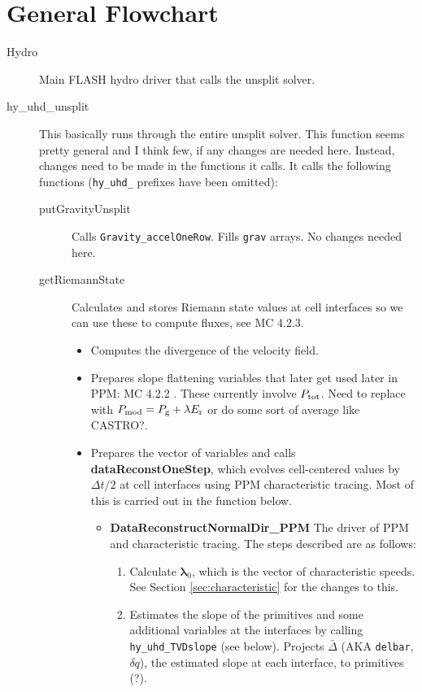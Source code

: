 \documentclass[preprint,11pt]{aastex}
\begin{document}
\section{General Flowchart}
\label{sec:flowchart}
\begin{description}
	\item[Hydro] Main FLASH hydro driver that calls the unsplit solver.
	\item[hy\_uhd\_unsplit] This basically runs through the entire unsplit solver.  {\color{blue}This function seems pretty general and I think few, if any changes are needed here.  Instead, changes need to be made in the functions it calls.}  It calls the following functions (\verb!hy_uhd_! prefixes have been omitted):
	\begin{description}
		\item[putGravityUnsplit] Calls \verb!Gravity_accelOneRow!.  Fills \verb!grav! arrays.  {\color{blue}No changes needed here}.
		\item[getRiemannState]  Calculates and stores Riemann state values at cell interfaces so we can use these to compute fluxes, see MC 4.2.3.
		\begin{itemize}
			\item Computes the divergence of the velocity field.
			\item Prepares slope flattening variables that later get used later in PPM: MC 4.2.2 . {\color{red} These currently involve $P_{\rm tot}$.} {\color{blue} Need to replace with $P_{\rm mod} = P_{\rm g} + \lambda E_{\rm r}$ or do some sort of average like CASTRO?}.
			\item Prepares the vector of variables and calls \textbf{dataReconstOneStep}, which evolves cell-centered values by $\Delta t / 2$ at cell interfaces using PPM characteristic tracing.  Most of this is carried out in the function below.
			\begin{itemize}
				\item \textbf{DataReconstructNormalDir\_PPM} The driver of PPM and characteristic tracing.  The steps described are as follows:
				\begin{enumerate}
					\item Calculate $\boldsymbol{\lambda}_0$, which is the vector of characteristic speeds. {\color{red} See Section \ref{sec:characteristic} for the changes to this.}
					\item Estimates the slope of the primitives and some additional variables at the interfaces by calling \verb!hy_uhd_TVDslope! (see below).  Projects $\bar{\Delta}$ (AKA \verb!delbar!, $\delta q$), the estimated slope at each interface, to primitives (?).%

\end{enumerate}
\end{itemize}
\end{itemize}
\end{description}
\end{description}
\end{document}
